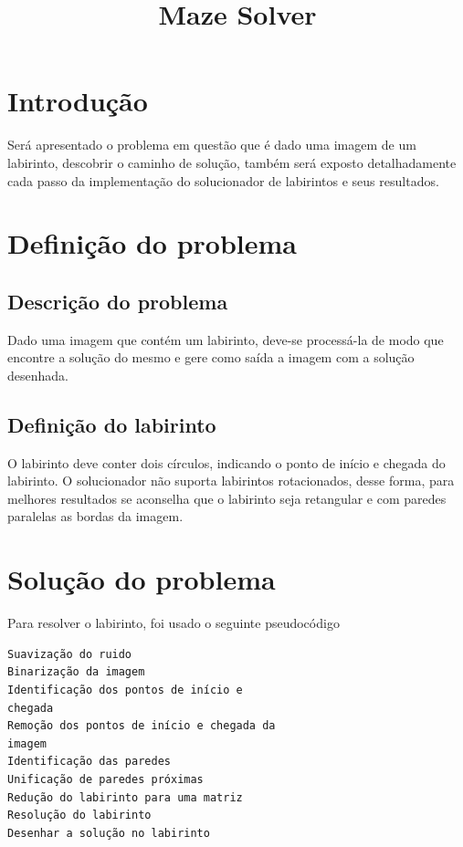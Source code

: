 \documentclass[conference]{IEEEtran}
\begin{document}
\title{Maze Solver
}

\author{
}

\maketitle

\section{Introdução}
Será apresentado o problema em questão que é dado uma imagem de um labirinto, descobrir o caminho de solução, também será exposto detalhadamente cada passo da implementação do solucionador de labirintos e seus resultados.

\section{Definição do problema}

\subsection{Descrição do problema}
Dado uma imagem que contém um labirinto, deve-se processá-la de modo que encontre a solução do mesmo e gere como saída a imagem com a solução desenhada.
\subsection {Definição do labirinto}
O labirinto deve conter dois círculos, indicando o ponto de início e chegada do labirinto. O solucionador não suporta labirintos rotacionados, desse forma, para melhores resultados se aconselha que o labirinto seja retangular e com paredes paralelas as bordas da imagem.


\section{Solução do problema}
Para resolver o labirinto, foi usado o seguinte pseudocódigo
\begin{verbatim}
Suavização do ruido
Binarização da imagem
Identificação dos pontos de início e
chegada
Remoção dos pontos de início e chegada da
imagem
Identificação das paredes
Unificação de paredes próximas
Redução do labirinto para uma matriz
Resolução do labirinto
Desenhar a solução no labirinto
\end{verbatim}
\end{document}
